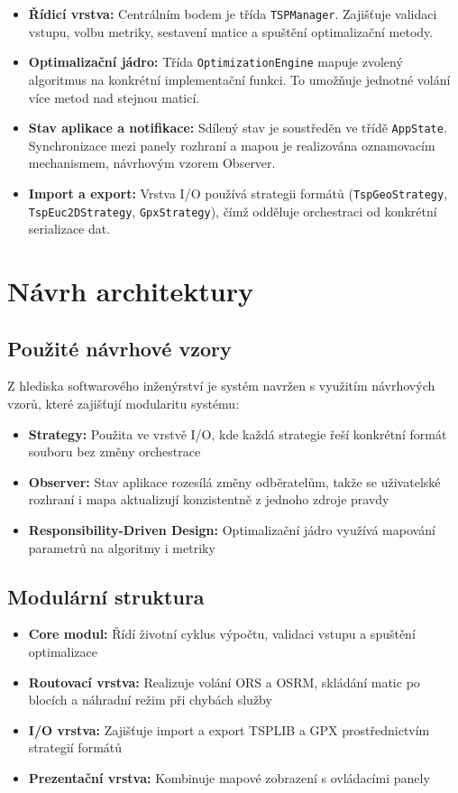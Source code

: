 \begin{itemize}
    \item \textbf{Řídicí vrstva:} Centrálním bodem je třída \texttt{TSPManager}. Zajišťuje validaci vstupu, volbu metriky, sestavení matice a spuštění optimalizační metody.
    \item \textbf{Optimalizační jádro:} Třída \texttt{OptimizationEngine} mapuje zvolený algoritmus na konkrétní implementační funkci. To umožňuje jednotné volání více metod nad stejnou maticí.
    \item \textbf{Stav aplikace a notifikace:} Sdílený stav je soustředěn ve třídě \texttt{AppState}. Synchronizace mezi panely rozhraní a mapou je realizována oznamovacím mechanismem, návrhovým vzorem Observer.
    \item \textbf{Import a export:} Vrstva I/O používá strategii formátů (\texttt{TspGeoStrategy}, \texttt{TspEuc2DStrategy}, \texttt{GpxStrategy}), čímž odděluje orchestraci od konkrétní serializace dat.
\end{itemize}



\section{Návrh architektury}

\subsection{Použité návrhové vzory}
Z hlediska softwarového inženýrství je systém navržen s využitím návrhových vzorů, které zajišťují modularitu systému:

\begin{itemize}
    \item \textbf{Strategy:} Použita ve vrstvě I/O, kde každá strategie řeší konkrétní formát souboru bez změny orchestrace
    \item \textbf{Observer:} Stav aplikace rozesílá změny odběratelům, takže se uživatelské rozhraní i mapa aktualizují konzistentně z jednoho zdroje pravdy
    \item \textbf{Responsibility-Driven Design:} Optimalizační jádro využívá mapování parametrů na algoritmy i metriky
\end{itemize}

\subsection{Modulární struktura}
\begin{itemize}
    \item \textbf{Core modul:} Řídí životní cyklus výpočtu, validaci vstupu a spuštění optimalizace
    \item \textbf{Routovací vrstva:} Realizuje volání ORS a OSRM, skládání matic po blocích a náhradní režim při chybách služby
    \item \textbf{I/O vrstva:} Zajišťuje import a export TSPLIB a GPX prostřednictvím strategií formátů
    \item \textbf{Prezentační vrstva:} Kombinuje mapové zobrazení s ovládacími panely
\end{itemize}

